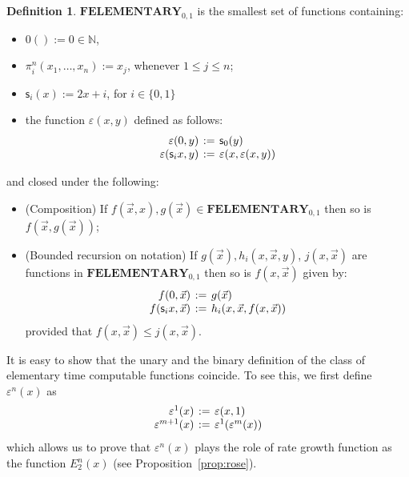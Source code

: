\documentclass[manuscript,screen]{acmart}
\newcommand{\dfn}{:=}
\theoremstyle{definition}
\newtheorem{defn}[thm]{Definition}
\theoremstyle{remark}
\newcommand{\Nat}{\mathbb{N}}
\newcommand{\elementary}{\mathbf{ELEMENTARY}}
\newcommand{\f}{\mathbf{F}}
\newcommand{\felementary}{\f\elementary}
\renewcommand{\succ}[1]{\mathsf{s}_{#1}}
\begin{document}
\begin{defn} \label{defn:E3}  $\felementary_{0,1}$ is the smallest set of functions containing:
\begin{itemize}
    \item $0()\dfn 0 \in \Nat$,  
    \item $\pi^n_i(x_1, \ldots, x_{n})\dfn x_j$, whenever $1 \leq j \leq n$;
    \item $\succ i(x)\dfn 2x+i$, for $i \in \{ 0,1\}$
    \item the function $\varepsilon(x,y)$ defined as follows:
    \begin{equation*}
    \arraycolsep=2pt
    \begin{array}{rcl}
             \varepsilon(0,y)&\dfn& \succ 0 (y)\\
             \varepsilon(\succ ix,y)&\dfn& \varepsilon(x,  \varepsilon(x,y))
    \end{array}
    \end{equation*}
    \end{itemize}
    and closed under the following:
    \begin{itemize}
    \item (Composition) If $f(\vec x, x), g(\vec x)\in \felementary_{0,1}$ then so is $f(\vec x, g(\vec x))$; 
    \item (Bounded recursion on notation) If $g(\vec x), h_i (x,\vec x,y)$, $j(x, \vec x)$ are functions in  $\felementary_{0,1}$  then so is $f(x, \vec x)$ given by:
    \begin{equation*}
    \arraycolsep=2pt
        \begin{array}{rcl}
              f(0, \vec{x})&\dfn &g(\vec{x})\\
              f(\succ ix, \vec{x})&\dfn & h_i(x, \vec{x}, f(x, \vec{x}))
        \end{array}
    \end{equation*}
    provided that $f(x, \vec{x})\leq j(x, \vec{x})$.
\end{itemize}
\end{defn}

It is easy to show that the unary and the binary definition of the class of elementary time computable functions coincide. To see this, we first define $\varepsilon^n(x)$ as
\begin{equation}\label{eqn:vaerpsilon}
\arraycolsep=2pt
    \begin{array}{rcl}
   \varepsilon^1(x)  &\dfn&  \varepsilon(x,1)  \\
   \varepsilon^{m+1}(x)& \dfn & \varepsilon^1(\varepsilon^{m}(x))   
\end{array}
\end{equation}
which allows us to prove that $\varepsilon^n(x)$ plays the role of rate growth function as the function $E_2^n(x)$ (see Proposition~\ref{prop:rose}). 
\end{document}
